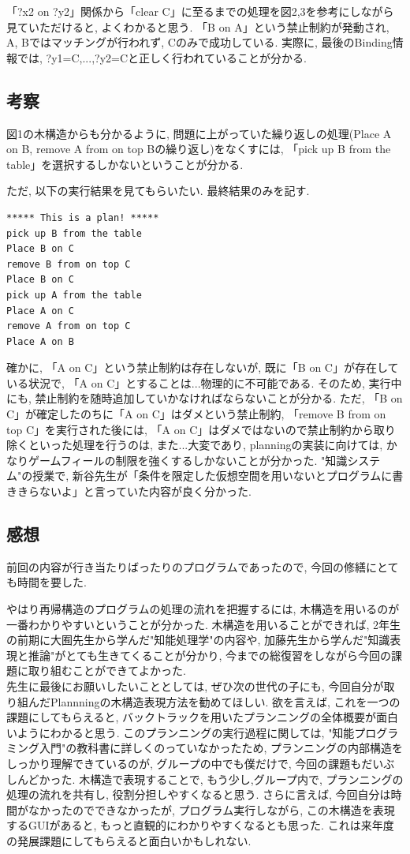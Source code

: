 \documentclass[uplatex,12pt]{jsarticle}
\begin{document}
「?x2 on ?y2」関係から「clear C」に至るまでの処理を図2,3を参考にしながら見ていただけると, よくわかると思う. 「B on A」という禁止制約が発動され, A, Bではマッチングが行われず, Cのみで成功している. 実際に, 最後のBinding情報では, {?y1=C,...,?y2=C}と正しく行われていることが分かる.

\subsection{考察}
図1の木構造からも分かるように, 問題に上がっていた繰り返しの処理(Place A on B, remove A from on top Bの繰り返し)をなくすには, 「pick up B from the table」を選択するしかないということが分かる.

ただ, 以下の実行結果を見てもらいたい. 最終結果のみを記す.
\begin{lstlisting}[caption=A onCが生じてしまう, label=src:No1]
***** This is a plan! *****
pick up B from the table
Place B on C
remove B from on top C
Place B on C
pick up A from the table
Place A on C
remove A from on top C
Place A on B
\end{lstlisting}


確かに, 「A on C」という禁止制約は存在しないが, 既に「B on C」が存在している状況で, 「A on C」とすることは...物理的に不可能である. そのため, 実行中にも, 禁止制約を随時追加していかなければならないことが分かる. ただ, 「B on C」が確定したのちに「A on C」はダメという禁止制約, 「remove B from on top C」を実行された後には, 「A on C」はダメではないので禁止制約から取り除くといった処理を行うのは, また...大変であり, planningの実装に向けては, かなりゲームフィールの制限を強くするしかないことが分かった. "知識システム"の授業で, 新谷先生が「条件を限定した仮想空間を用いないとプログラムに書ききらないよ」と言っていた内容が良く分かった.



\subsection{感想}
前回の内容が行き当たりばったりのプログラムであったので, 今回の修繕にとても時間を要した. 

やはり再帰構造のプログラムの処理の流れを把握するには, 木構造を用いるのが一番わかりやすいということが分かった. 木構造を用いることができれば, 2年生の前期に大囿先生から学んだ"知能処理学"の内容や, 加藤先生から学んだ"知識表現と推論"がとても生きてくることが分かり, 今までの総復習をしながら今回の課題に取り組むことができてよかった. \\
先生に最後にお願いしたいこととしては, ぜひ次の世代の子にも, 今回自分が取り組んだPlannningの木構造表現方法を勧めてほしい. 欲を言えば, これを一つの課題にしてもらえると, バックトラックを用いたプランニングの全体概要が面白いようにわかると思う. このプランニングの実行過程に関しては, "知能プログラミング入門"の教科書に詳しくのっていなかったため, プランニングの内部構造をしっかり理解できているのが, グループの中でも僕だけで, 今回の課題もだいぶしんどかった. 木構造で表現することで, もう少し,グループ内で, プランニングの処理の流れを共有し, 役割分担しやすくなると思う. さらに言えば, 今回自分は時間がなかったのでできなかったが, プログラム実行しながら, この木構造を表現するGUIがあると, もっと直観的にわかりやすくなるとも思った. これは来年度の発展課題にしてもらえると面白いかもしれない.
\end{document}
